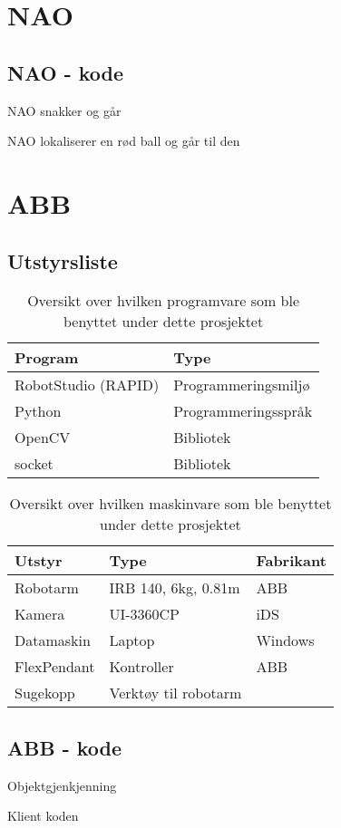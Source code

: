 \section{NAO}
\subsection{NAO - kode}
NAO snakker og går

NAO lokaliserer en rød ball og går til den


\section{ABB}
\subsection{Utstyrsliste}
\begin{table}[!htb]
    \centering
    \caption{Oversikt over hvilken programvare som ble benyttet under dette prosjektet}
    \begin{tabular}{|l|l|}
        \hline
        \textbf{Program} & \textbf{Type}\\
        \hline
        RobotStudio (RAPID) & Programmeringsmiljø\\
        \hline
        Python & Programmeringsspråk \\
        \hline
        OpenCV & Bibliotek \\
        \hline
        socket & Bibliotek \\
        \hline
    \end{tabular} \newline
    \label{app:soft}
\end{table}
\begin{table}[!htb]
    \centering
    \caption{Oversikt over hvilken maskinvare som ble benyttet under dette prosjektet}
    \begin{tabular}{|l|l|l|}
        \hline
        \textbf{Utstyr} & \textbf{Type} & \textbf{Fabrikant}\\
        \hline
        Robotarm & IRB 140, 6kg, 0.81m & ABB\\
        \hline
        Kamera & UI-3360CP & iDS\\
        \hline
        Datamaskin & Laptop & Windows \\
        \hline
        FlexPendant & Kontroller & ABB \\
        \hline
        Sugekopp & Verktøy til robotarm &  \\
        \hline
    \end{tabular} \newline
    \label{app:hard}
\end{table}

\subsection{ABB - kode}
Objektgjenkjenning

Klient koden

